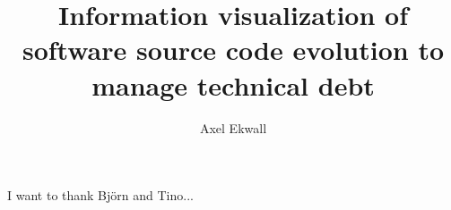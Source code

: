 \documentclass[sigchi, nonacm]{acmart}
\begin{document}
\title{Information visualization of software source code evolution to manage technical debt}

\author{Axel Ekwall}




\maketitle








\begin{acks}
I want to thank Björn and Tino...
\end{acks}




\appendix
\end{document}
